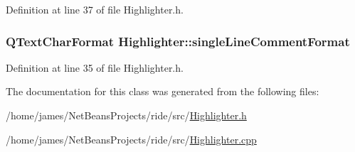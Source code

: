 Definition at line 37 of file Highlighter.\-h.

\hypertarget{class_highlighter_ad1ca0f6942b0451781d7e32f1781f22b}{
\subsubsection[{single\-Line\-Comment\-Format}]{\setlength{\rightskip}{0pt plus 5cm}Q\-Text\-Char\-Format Highlighter\-::single\-Line\-Comment\-Format\hspace{0.3cm}{\ttfamily [private]}}}\label{class_highlighter_ad1ca0f6942b0451781d7e32f1781f22b}


Definition at line 35 of file Highlighter.\-h.



The documentation for this class was generated from the following files\-:\begin{DoxyCompactItemize}
\item 
/home/james/\-Net\-Beans\-Projects/ride/src/\hyperlink{_highlighter_8h}{Highlighter.\-h}\item 
/home/james/\-Net\-Beans\-Projects/ride/src/\hyperlink{_highlighter_8cpp}{Highlighter.\-cpp}\end{DoxyCompactItemize}
